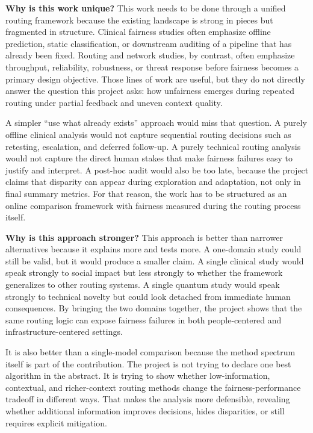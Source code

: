 \documentclass{IEEEtran}
\begin{document}
\noindent\textbf{Why is this work unique?} This work needs to be done through a unified routing framework because the existing landscape is strong in pieces but fragmented in structure. Clinical fairness studies often emphasize offline prediction, static classification, or downstream auditing of a pipeline that has already been fixed. Routing and network studies, by contrast, often emphasize throughput, reliability, robustness, or threat response before fairness becomes a primary design objective. Those lines of work are useful, but they do not directly answer the question this project asks: how unfairness emerges during repeated routing under partial feedback and uneven context quality.

A simpler ``use what already exists'' approach would miss that question. A purely offline clinical analysis would not capture sequential routing decisions such as retesting, escalation, and deferred follow-up. A purely technical routing analysis would not capture the direct human stakes that make fairness failures easy to justify and interpret. A post-hoc audit would also be too late, because the project claims that disparity can appear during exploration and adaptation, not only in final summary metrics. For that reason, the work has to be structured as an online comparison framework with fairness measured during the routing process itself.

\noindent\textbf{Why is this approach stronger?} This approach is better than narrower alternatives because it explains more and tests more. A one-domain study could still be valid, but it would produce a smaller claim. A single clinical study would speak strongly to social impact but less strongly to whether the framework generalizes to other routing systems. A single quantum study would speak strongly to technical novelty but could look detached from immediate human consequences. By bringing the two domains together, the project shows that the same routing logic can expose fairness failures in both people-centered and infrastructure-centered settings.

It is also better than a single-model comparison because the method spectrum itself is part of the contribution. The project is not trying to declare one best algorithm in the abstract. It is trying to show whether low-information, contextual, and richer-context routing methods change the fairness-performance tradeoff in different ways. That makes the analysis more defensible,  revealing whether additional information improves decisions, hides disparities, or still requires explicit mitigation.
\end{document}

